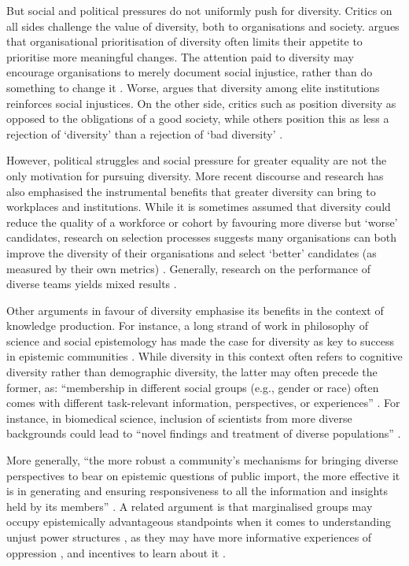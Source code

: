 But social and political pressures do not uniformly push for diversity. Critics on all sides challenge the value of diversity, both to organisations and society. \textcite{Ahmed_2012} argues that organisational prioritisation of diversity often limits their appetite to prioritise more meaningful changes. The attention paid to diversity may encourage organisations to merely document social injustice, rather than do something to change it \cite{Ahmed_2012,Rossi2020-ROSWNA-2}. Worse, \textcite{Warikoo_2019} argues that diversity among elite institutions reinforces social injustices. On the other side, critics such as \textcite{Goodhart} position diversity as opposed to the obligations of a good society, while others position this as less a rejection of `diversity' than a rejection of `bad diversity' \cite{lentin_Multiculturalism_2011}.

However, political struggles and social pressure for greater equality are not the only motivation for pursuing diversity. More recent discourse and research has also emphasised the instrumental benefits that greater diversity can bring to workplaces and institutions. While it is sometimes assumed that diversity could reduce the quality of a workforce or cohort by favouring more diverse but `worse' candidates, research on selection processes suggests many organisations can both improve the diversity of their organisations and select `better' candidates (as measured by their own metrics) \cite{autor2008does,noray2023systemic}. Generally, research on the performance of diverse teams yields mixed results \cite{daubner2017dovetailing,page2019diversity,noray2023systemic,muller_learning_2019}.

Other arguments in favour of diversity emphasise its benefits in the context of knowledge production. For instance, a long strand of work in philosophy of science and social epistemology has made the case for diversity as key to success in epistemic communities \cite{mill1998liberty,merton1942note,wylie2006introduction}. While diversity in this context often refers to cognitive diversity rather than demographic diversity, the latter may often precede the former, as: ``membership in different social groups (e.g., gender or race) often comes with different task-relevant information, perspectives, or experiences'' \cite{peters2021hidden}. For instance, in biomedical science, inclusion of scientists from more diverse backgrounds could lead to ``novel findings and treatment of diverse populations'' \cite{swartz2019science}.

More generally, ``the more robust a community’s mechanisms for bringing diverse perspectives to bear on epistemic questions of public import, the more effective it is in generating and ensuring responsiveness to all the information and insights held by its members'' \cite{wylie2006introduction}. A related argument is that marginalised groups may occupy epistemically advantageous standpoints when it comes to understanding unjust power structures \cite{harding2004feminist,dror2023there,steel_multiple_2018}, as they may have more informative experiences of oppression \cite{mills2015blackness}, and incentives to learn about it \cite{jaggar1983feminist}.

